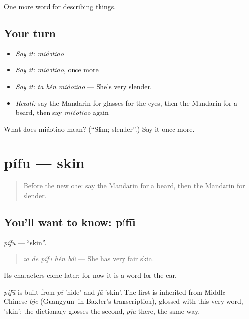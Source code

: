 \begin{grammarlens}[title={What you've built}]
One more word for describing things.
\end{grammarlens}

\subsection*{Your turn}
\begin{itemize}
\raggedright
  \item \emph{Say it:} \emph{miáotiao}
  \item \emph{Say it:} \emph{miáotiao}, once more
  \item \emph{Say it:} \emph{tā hěn miáotiao} — She's very slender.
  \item \emph{Recall:} say the Mandarin for glasses for the eyes, then the Mandarin for a beard, then say \emph{miáotiao} again
\end{itemize}

\begin{tcolorbox}[breakable,colback=teal!4,colframe=teal!35!black,title={Before you move on}]
What does miáotiao mean? (\textquotedblleft{}Slim; slender\textquotedblright{}.) Say it once more.
\end{tcolorbox}
\section[pífū]{pífū — skin}

\label{lesson:ZH-C233-pifu}



\begin{quote}
Before the new one: say the Mandarin for a beard, then the Mandarin for slender.
\end{quote}

\subsection*{You'll want to know: pífū}
\emph{pífū} — \textquotedblleft{}skin\textquotedblright{}.

\begin{quote}
\emph{tā de pífū hěn bái} — She has very fair skin.
\end{quote}

Its characters come later; for now it is a word for the ear.

\begin{cousinweb}
\emph{pífū} is built from \emph{pí} 'hide' and \emph{fū} 'skin'. The first is inherited from Middle Chinese \emph{bje} (Guangyun, in Baxter's transcription), glossed with this very word, 'skin'; the dictionary glosses the second, \emph{pju} there, the same way.
\end{cousinweb}

